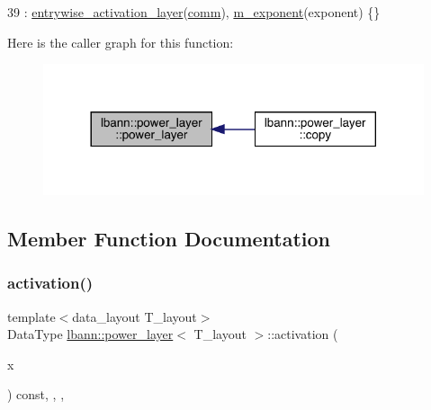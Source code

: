 \begin{DoxyCode}
39     : \hyperlink{classlbann_1_1entrywise__activation__layer_aada1d9200612dcd13259799ef327c557}{entrywise\_activation\_layer}(\hyperlink{file__io_8cpp_ab048c6f9fcbcfaa57ce68b00263dbebe}{comm}), \hyperlink{classlbann_1_1power__layer_a778b995d25e24f5c82ab85cfeab2ee41}{m\_exponent}(exponent) \{\}
\end{DoxyCode}
Here is the caller graph for this function\+:\nopagebreak
\begin{figure}[H]
\begin{center}
\leavevmode
\includegraphics[width=317pt]{classlbann_1_1power__layer_a0429ad3cad14663b8fea013360b60e04_icgraph}
\end{center}
\end{figure}


\subsection{Member Function Documentation}
\mbox{\label{classlbann_1_1power__layer_ad7b7265367e2623fcd242920737a3acb}} 
\subsubsection{\texorpdfstring{activation()}{activation()}}
{\footnotesize\ttfamily template$<$data\+\_\+layout T\+\_\+layout$>$ \\
Data\+Type \hyperlink{classlbann_1_1power__layer}{lbann\+::power\+\_\+layer}$<$ T\+\_\+layout $>$\+::activation (\begin{DoxyParamCaption}\item[{Data\+Type}]{x }\end{DoxyParamCaption}) const\hspace{0.3cm}{\ttfamily [inline]}, {\ttfamily [override]}, {\ttfamily [protected]}, {\ttfamily [virtual]}}

